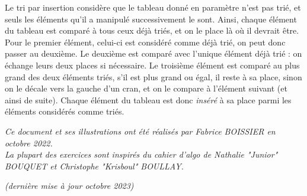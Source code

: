 \documentclass[11pt,a4paper]{article}
\begin{document}
Le tri par insertion considère que le tableau donné en paramètre n'est pas trié, et seuls les éléments qu'il a manipulé successivement le sont.
Ainsi, chaque élément du tableau est comparé à tous ceux déjà triés, et on le place là où il devrait être.
Pour le premier élément, celui-ci est considéré comme déjà trié, on peut donc passer au deuxième.
Le deuxième est comparé avec l'unique élément déjà trié : on échange leurs deux places si nécessaire.
Le troisième élément est comparé au plus grand des deux éléments triés, s'il est plus grand ou égal, il reste à sa place, sinon on le décale vers la gauche d'un cran, et on le compare à l'élément suivant (et ainsi de suite).
Chaque élément du tableau est donc \textit{inséré} à sa place parmi les éléments considérés comme triés.

\bigskip



\vfillFirst

\vfillLast


\begin{center}
\textit{Ce document et ses illustrations ont été réalisés par Fabrice BOISSIER en octobre 2022.\\
La plupart des exercices sont inspirés du cahier d'algo de Nathalie "Junior" BOUQUET et Christophe "Krisboul" BOULLAY.}

\textit{(dernière mise à jour octobre 2023)}
\end{center}
\end{document}

